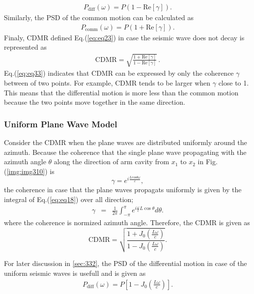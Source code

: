 \begin{eqnarray} \label{eq:eq32}
  P_{\mathrm{diff}}(\omega) = P (1-\mathrm{Re}\left[\gamma\right]).
\end{eqnarray}
Similarly, the PSD of the common motion can be calculated as
\begin{eqnarray}
  P_{\mathrm{comm}}(\omega) = P (1+\mathrm{Re}\left[\gamma\right]).
\end{eqnarray}
Finaly, CDMR defined Eq.(\ref{eq:eq23}) in case the seismic wave does not decay is represented as
\begin{eqnarray}
 \mathrm{CDMR} = \sqrt{\frac{1 + \mathrm{Re} \left[\gamma \right] }{1 - \mathrm{Re} \left[\gamma \right]}}\,. \label{eq:eq33}
\end{eqnarray}
Eq.(\ref{eq:eq33}) indicates that CDMR can be expressed by only the coherence $\gamma$ between of two points. For example, CDMR tends to be larger when $\gamma$ close to 1. This means that the differential motion is more less than the common motion because the two points move together in the same direction.



\subsubsection{Uniform Plane Wave Model}
Consider the CDMR when the plane waves are distributed uniformly around the azimuth. Because the coherence that the single plane wave propagating with the azimuth angle $\theta$ along the direction of arm cavity from $x_1$ to $x_2$ in Fig.(\ref{img:img310}) is 
\begin{equation}
  \gamma = e^{i\frac{L\mathrm{cos}\theta\omega}{c}}, \label{eq:eq18}
\end{equation} 
the coherence in case that the plane waves propagats uniformly is given by the integral of Eq.(\ref{eq:eq18}) over all direction;
\begin{eqnarray} \label{eq:eq19}
  \gamma &=& \frac{1}{2\pi} \int_{-\pi}^{\pi} e^{i\frac{\omega}{c} L\cos \theta} d \theta .
\end{eqnarray}
where the coherence is normized azimuth angle. Therefore, the CDMR is given as
\begin{equation}  \label{eq:eq20}
  \mathrm{CDMR} = \sqrt{\frac{1+J_0(\frac{L\omega}{c})}{1-J_0(\frac{L\omega}{c})}} .
\end{equation}

For later discussion in \cref{sec:332}, the PSD of the differential motion in case of the uniform seismic waves is usefull and is given as
\begin{eqnarray} \label{eq:eq21}
  P_{\mathrm{diff}}(\omega) = P \left[1-J_0\left(\frac{L\omega}{c}\right)\right] .
\end{eqnarray}

